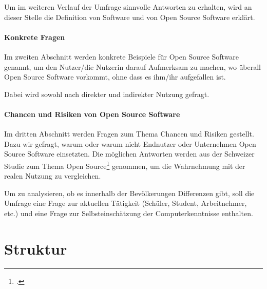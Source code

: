\documentclass[a4paper]{article}
\begin{document}
	       Um im weiteren Verlauf der Umfrage sinnvolle Antworten zu erhalten, wird an dieser Stelle die Definition von Software und von Open Source Software erklärt.
	       
	   
	   \paragraph{Konkrete Fragen}
	       Im zweiten Abschnitt werden konkrete Beispiele für Open Source Software genannt, um den Nutzer/die Nutzerin  darauf Aufmerksam zu machen, wo überall Open Source Software vorkommt, ohne dass es ihm/ihr aufgefallen ist.
	       
	       Dabei wird sowohl nach direkter und indirekter Nutzung gefragt.
	       
	   \paragraph{Chancen und Risiken von Open Source Software}
	       Im dritten Abschnitt werden Fragen zum Thema Chancen und Risiken gestellt. Dazu wir gefragt, warum oder warum nicht Endnutzer oder Unternehmen Open Source Software einsetzten. Die möglichen Antworten werden aus der Schweizer Studie zum Thema Open Source\footcite{oss:studie} genommen, um die Wahrnehmung mit der realen Nutzung zu vergleichen.
	   \\\par
	   Um zu analysieren, ob es innerhalb der Bevölkerungen Differenzen gibt, soll die Umfrage eine Frage zur aktuellen Tätigkeit (Schüler, Student, Arbeitnehmer, etc.) und eine Frage zur Selbsteinschätzung der Computerkenntnisse enthalten.
	   
	   
	\section{Struktur}
	
    
    \clearpage
    \printbibliography
\end{document}
